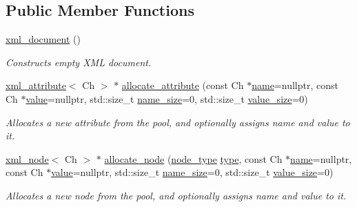 \subsection*{Public Member Functions}
\begin{DoxyCompactItemize}
\item 
\mbox{\hyperlink{classrapidxml_1_1xml__document_a6ce266cc52d549c42abe3a3d5e8af9ba}{xml\+\_\+document}} ()
\begin{DoxyCompactList}\small\item\em Constructs empty X\+ML document. \end{DoxyCompactList}\item 
\mbox{\hyperlink{classrapidxml_1_1xml__attribute}{xml\+\_\+attribute}}$<$ Ch $>$ $\ast$ \mbox{\hyperlink{classrapidxml_1_1memory__pool_aa7286aec00dac6d9af11cdc69e1e470e}{allocate\+\_\+attribute}} (const Ch $\ast$\mbox{\hyperlink{classrapidxml_1_1xml__base_af8436e9ee14c127220113eaa956eafee}{name}}=nullptr, const Ch $\ast$\mbox{\hyperlink{classrapidxml_1_1xml__base_a558b1045e6751e4024309d41bf35c542}{value}}=nullptr, std\+::size\+\_\+t \mbox{\hyperlink{classrapidxml_1_1xml__base_ad01e2eff02202b130baad012d1ed7328}{name\+\_\+size}}=0, std\+::size\+\_\+t \mbox{\hyperlink{classrapidxml_1_1xml__base_aa6981b3244607ea4ae7634f74f25361b}{value\+\_\+size}}=0)
\begin{DoxyCompactList}\small\item\em Allocates a new attribute from the pool, and optionally assigns name and value to it. \end{DoxyCompactList}\item 
\mbox{\hyperlink{classrapidxml_1_1xml__node}{xml\+\_\+node}}$<$ Ch $>$ $\ast$ \mbox{\hyperlink{classrapidxml_1_1memory__pool_af74bb7be25f96b10917ceb1975f0a8d1}{allocate\+\_\+node}} (\mbox{\hyperlink{namespacerapidxml_a6a276b85e2da28c5f9c3dbce61c55682}{node\+\_\+type}} \mbox{\hyperlink{classrapidxml_1_1xml__node_a026a603e420a2e3e7ab820cfbd1a7e97}{type}}, const Ch $\ast$\mbox{\hyperlink{classrapidxml_1_1xml__base_af8436e9ee14c127220113eaa956eafee}{name}}=nullptr, const Ch $\ast$\mbox{\hyperlink{classrapidxml_1_1xml__base_a558b1045e6751e4024309d41bf35c542}{value}}=nullptr, std\+::size\+\_\+t \mbox{\hyperlink{classrapidxml_1_1xml__base_ad01e2eff02202b130baad012d1ed7328}{name\+\_\+size}}=0, std\+::size\+\_\+t \mbox{\hyperlink{classrapidxml_1_1xml__base_aa6981b3244607ea4ae7634f74f25361b}{value\+\_\+size}}=0)
\begin{DoxyCompactList}\small\item\em Allocates a new node from the pool, and optionally assigns name and value to it. \end{DoxyCompactList}\item 

\end{DoxyCompactItemize}

